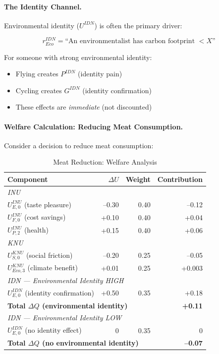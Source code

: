 \paragraph{The Identity Channel.}
Environmental identity ($U^{IDN}$) is often the primary driver:

\begin{equation}
r^{IDN}_{Eco} = \text{``An environmentalist has carbon footprint } < X\text{''}
\end{equation}

For someone with strong environmental identity:
\begin{itemize}
\item Flying creates $P^{IDN}$ (identity pain)
\item Cycling creates $G^{IDN}$ (identity confirmation)
\item These effects are \emph{immediate} (not discounted)
\end{itemize}

\paragraph{Welfare Calculation: Reducing Meat Consumption.}
Consider a decision to reduce meat consumption:

\begin{table}[htbp]
\centering
\caption{Meat Reduction: Welfare Analysis}
\label{tab:meat-welfare}
\small
\renewcommand{\arraystretch}{1.2}
\begin{tabular}{@{}lrrr@{}}
\toprule
\textbf{Component} & \textbf{$\Delta U$} & \textbf{Weight} & \textbf{Contribution} \\
\midrule
\multicolumn{4}{l}{\textit{INU}} \\
$U^{INU}_{E,0}$ (taste pleasure) & --0.30 & 0.40 & --0.12 \\
$U^{INU}_{F,0}$ (cost savings) & +0.10 & 0.40 & +0.04 \\
$U^{INU}_{P,2}$ (health) & +0.15 & 0.40 & +0.06 \\
\midrule
\multicolumn{4}{l}{\textit{KNU}} \\
$U^{KNU}_{S,0}$ (social friction) & --0.20 & 0.25 & --0.05 \\
$U^{KNU}_{Eco,3}$ (climate benefit) & +0.01 & 0.25 & +0.003 \\
\midrule
\multicolumn{4}{l}{\textit{IDN --- Environmental Identity HIGH}} \\
$U^{IDN}_{E,0}$ (identity confirmation) & +0.50 & 0.35 & +0.18 \\
\midrule
\multicolumn{3}{l}{\textbf{Total $\Delta Q$ (environmental identity)}} & \textbf{+0.11} \\
\midrule
\multicolumn{4}{l}{\textit{IDN --- Environmental Identity LOW}} \\
$U^{IDN}_{E,0}$ (no identity effect) & 0 & 0.35 & 0 \\
\midrule
\multicolumn{3}{l}{\textbf{Total $\Delta Q$ (no environmental identity)}} & \textbf{--0.07} \\
\bottomrule
\end{tabular}
\end{table}

